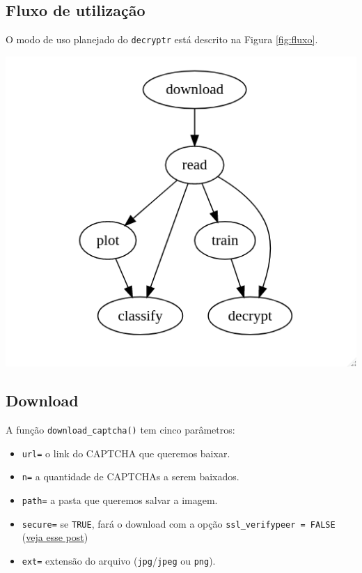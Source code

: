 \documentclass[12pt,]{report}
\providecommand{\tightlist}{%
  \setlength{\itemsep}{0pt}\setlength{\parskip}{0pt}}
\let\origfigure\figure
\let\endorigfigure\endfigure
\renewenvironment{figure}[1][2] {
    \expandafter\origfigure\expandafter[H]
} {
    \endorigfigure
}
\begin{document}
\subsection{Fluxo de utilização}\label{fluxo-de-utilizacao}

O modo de uso planejado do \texttt{decryptr} está descrito na Figura
\ref{fig:fluxo}.

\begin{figure}

{\centering \includegraphics[width=0.6\linewidth]{imgs/fluxo} 

}

\caption{Fluxo de utilização do pacote `decryptr`.}\label{fig:fluxo}
\end{figure}

\subsection{Download}\label{download}

A função \texttt{download\_captcha()} tem cinco parâmetros:

\begin{itemize}
\tightlist
\item
  \texttt{url=} o link do CAPTCHA que queremos baixar.
\item
  \texttt{n=} a quantidade de CAPTCHAs a serem baixados.
\item
  \texttt{path=} a pasta que queremos salvar a imagem.
\item
  \texttt{secure=} se \texttt{TRUE}, fará o download com a opção
  \texttt{ssl\_verifypeer\ =\ FALSE}
  (\href{http://curso-r.com/blog/2017/03/31/2017-03-31-ssl/}{veja esse
  post})
\item
  \texttt{ext=} extensão do arquivo (\texttt{jpg}/\texttt{jpeg} ou
  \texttt{png}).
\end{itemize}
\end{document}
